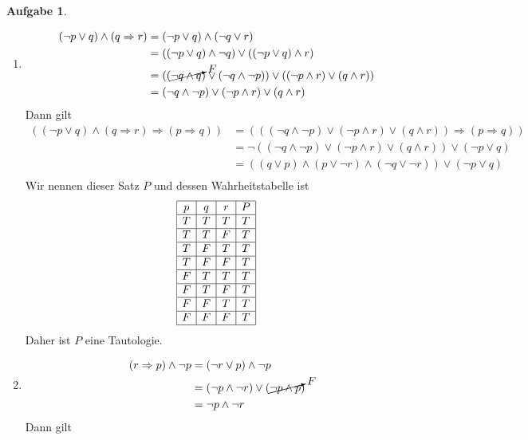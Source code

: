 \documentclass{article}
\theoremstyle{definition}
\newtheorem{ub}{Aufgabe}
\begin{document}
\begin{ub}
	\begin{enumerate}
		\item 
		\begin{align*}
			(\neg p \lor q) \land (q \Rightarrow r) & = (\neg p \lor q) \land (\neg q \lor r) \\
			& = ((\neg p \lor q) \land \neg q) \lor ((\neg p \lor q) \land r) \\
			& = ((\cancelto{F}{\neg q \land q}) \lor (\neg q \land \neg p)) \lor ((\neg p \land r) \lor (q \land r)) \\
			& = (\neg q \land \neg p) \lor (\neg p \land r) \lor (q \land r) 
		\end{align*}
		Dann gilt
		\begin{align*}
			((\neg p \lor q) \land (q \Rightarrow r) \Rightarrow (p \Rightarrow q)) & = (((\neg q \land \neg p) \lor (\neg p \land r) \lor (q \land r) ) \Rightarrow (p \Rightarrow q)) \\
			& = \neg ((\neg q \land \neg p) \lor (\neg p \land r) \lor (q \land r)) \lor (\neg p \lor q) \\
			& = ((q \lor p) \land (p \lor \neg r) \land (\neg q \lor \neg r)) \lor (\neg p \lor q) \\
		\end{align*}
		Wir nennen dieser Satz $ P $ und dessen Wahrheitstabelle ist
		\[ 
		\begin{array}{|c|c|c|c|}
			\hline 
			p & q & r & P \\ \hline
			T & T & T & T \\ \hline
			T & T & F & T \\ \hline
			T & F & T & T \\ \hline
			T & F & F & T \\ \hline
			F & T & T & T \\ \hline
			F & T & F & T \\ \hline
			F & F & T & T \\ \hline
			F & F & F & T \\ \hline
		\end{array}
		 \]
		Daher ist $ P $ eine Tautologie.
		\item 
			\begin{align*}
			(r \Rightarrow p) \land \neg p & = (\neg r \lor p) \land \neg p \\
			& = (\neg p \land \neg r) \lor (\cancelto{F}{\neg p \land p}) \\
			& = \neg p \land \neg r
		\end{align*}
		Dann gilt

\end{enumerate}
\end{ub}
\end{document}
